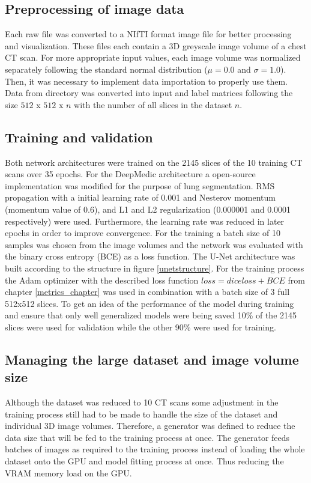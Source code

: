 \subsection{Preprocessing of image data}
Each raw file was converted to a NIfTI format \cite{nifti} image file for better processing and visualization. These files each contain a 3D greyscale image volume of a chest CT scan. For more appropriate input values, each image volume was normalized separately following the standard normal distribution ($\mu = 0.0$ and $\sigma = 1.0$).\newline
Then, it was necessary to implement data importation to properly use them. Data from directory was converted into input and label matrices following the size $512$ x $512$ x $n$ with the number of all slices in the dataset $n$.

\subsection{Training and validation}
Both network architectures were trained on the 2145 slices of the 10 training CT scans over 35 epochs.\newline
For the DeepMedic architecture a open-source implementation \cite{deepmediconline} was modified for the purpose of lung segmentation. RMS propagation with a initial learning rate of 0.001 and Nesterov momentum (momentum value of 0.6), and L1 and L2 regularization (0.000001 and 0.0001 respectively) were used. Furthermore, the learning rate was reduced in later epochs in order to improve convergence. For the training a batch size of 10 samples was chosen from the image volumes and the network was evaluated with the binary cross entropy (BCE) as a loss function.\newline
The U-Net architecture was built according to the structure in figure \ref{unetstructure}. For the training process the Adam optimizer with the described loss function $loss = dice loss + BCE$ from chapter \ref{metrics_chapter} was used in combination with a batch size of 3 full 512x512 slices. To get an idea of the performance of the model during training and ensure that only well generalized models were being saved 10\% of the 2145 slices were used for validation while the other 90\% were used for training.\newline

\subsection{Managing the large dataset and image volume size}
Although the dataset was reduced to 10 CT scans some adjustment in the training process still had to be made to handle the size of the dataset and individual 3D image volumes.\newline
Therefore, a generator was defined to reduce the data size that will be fed to the training process at once. The generator feeds batches of images as required to the training process instead of loading the whole dataset onto the GPU and model fitting process at once. Thus reducing the VRAM memory load on the GPU.


